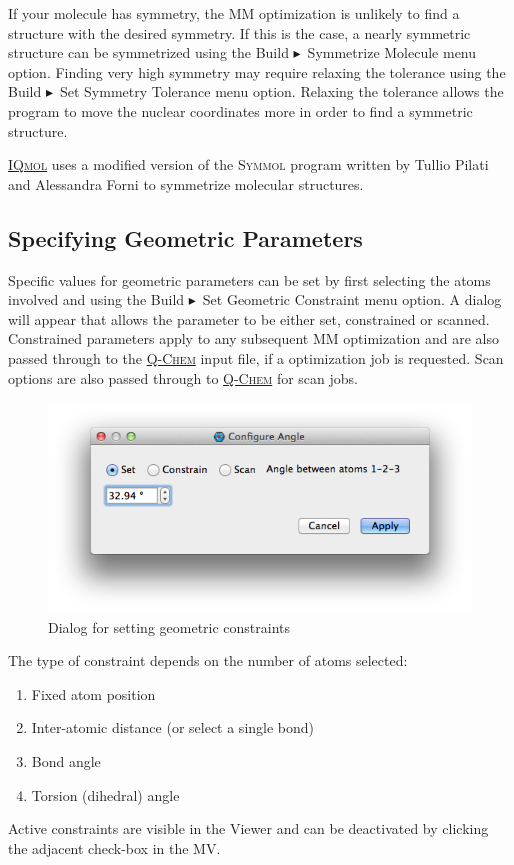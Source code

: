 \documentclass[a4paper,12pt]{article}
\newcommand{\qchem}{\href{http://q-chem.com}{{\scshape Q-Chem}}}
\newcommand{\iqmol}{\href{http://iqmol.org}{{\scshape IQmol}}}
\newcommand{\symmol}{{\scshape Symmol}}
\newcommand{\bt}{\ensuremath{\blacktriangleright}}
\begin{document}
If your molecule has symmetry, the MM optimization is unlikely to find a
structure with the desired symmetry.  If this is the case, a nearly symmetric
structure can be symmetrized using the Build \bt\ Symmetrize
Molecule menu option.  Finding very high symmetry may require relaxing the
tolerance using the Build \bt\ Set Symmetry Tolerance menu
option.  Relaxing the tolerance allows the program to move the nuclear
coordinates more in order to find a symmetric structure.

\iqmol{} uses a modified version of the \symmol{}\cite{SymMol} program written
by Tullio Pilati and Alessandra Forni to symmetrize molecular structures.



\subsection{Specifying Geometric Parameters}

Specific values for geometric parameters can be set by first selecting the
atoms involved and using the Build \bt\ Set Geometric Constraint menu
option.  A dialog will appear that allows the parameter to be either set,
constrained or scanned.  Constrained parameters apply to any subsequent MM
optimization and are also passed through to the \qchem{} input file, if a
optimization job is requested.  Scan options are also passed through to
\qchem{} for scan jobs.

\begin{figure}[h]
\begin{center}
\includegraphics[scale=0.5]{figures/ConstraintDialog.png}
\caption{Dialog for setting geometric constraints}
\end{center}
\end{figure}

The type of constraint depends on the number of atoms selected:
\vspace{-1em}
\begin{enumerate}
\itemsep0em
\item Fixed atom position
\item Inter-atomic distance (or select a single bond)
\item Bond angle
\item Torsion (dihedral) angle
\end{enumerate}
Active constraints are visible in the Viewer and can be deactivated by clicking
the adjacent check-box in the MV.
\end{document}
